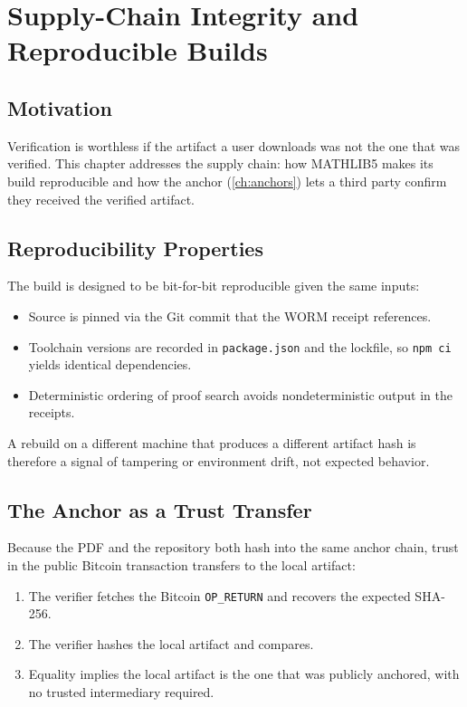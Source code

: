 \chapter{Supply-Chain Integrity and Reproducible Builds}
\label{ch:supply}

\section{Motivation}
\label{sec:supply-mot}

Verification is worthless if the artifact a user downloads was not the one
that was verified. This chapter addresses the supply chain: how MATHLIB5
makes its build reproducible and how the anchor (\cref{ch:anchors}) lets a
third party confirm they received the verified artifact.

\section{Reproducibility Properties}
\label{sec:supply-repro}

The build is designed to be bit-for-bit reproducible given the same
inputs:
\begin{itemize}
  \item Source is pinned via the Git commit that the WORM receipt
        references.
  \item Toolchain versions are recorded in \texttt{package.json} and the
        lockfile, so \texttt{npm ci} yields identical dependencies.
  \item Deterministic ordering of proof search avoids nondeterministic
        output in the receipts.
\end{itemize}
A rebuild on a different machine that produces a different artifact hash is
therefore a signal of tampering or environment drift, not expected
behavior.

\section{The Anchor as a Trust Transfer}
\label{sec:supply-anchor}

Because the PDF and the repository both hash into the same anchor chain,
trust in the public Bitcoin transaction transfers to the local artifact:
\begin{enumerate}
  \item The verifier fetches the Bitcoin \texttt{OP\_RETURN} and recovers
        the expected SHA-256.
  \item The verifier hashes the local artifact and compares.
  \item Equality implies the local artifact is the one that was publicly
        anchored, with no trusted intermediary required.
\end{enumerate}

